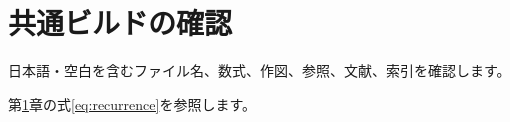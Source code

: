\documentclass[dvipdfmx,a4paper,11pt,fleqn,openany]{jsbook}
\begin{document}
\chapter{共通ビルドの確認}
\label{ch:check}
日本語・空白を含むファイル名、数式、作図、参照、文献、索引を確認します。

第\ref{ch:check}章の式\eqref{eq:recurrence}を参照します。\cite{test}


\printindex
\end{document}
